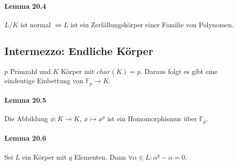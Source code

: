 \documentclass{scrartcl}
\begin{document}
\paragraph{Lemma 20.4}
$L/K$ ist normal $\Leftrightarrow L$ ist ein Zerfällungskörper einer Familie von Polynomen.

\subsection{Intermezzo: Endliche Körper}

$p$ Primzahl und $K$ Körper mit $char(K)=p$. Daraus folgt es gibt eine
eindeutige Einbettung von $\mathbb{F}_p \to K$.
\paragraph{Lemma 20.5}
Die Abbildung $\phi: K \to K,~x \mapsto x^p$ ist ein Homomorphismus über $\mathbb{F}_p$.

\paragraph{Lemma 20.6}
Sei $L$ ein Körper mit $q$ Elementen. Dann $\forall \alpha \in L: \alpha^q -
\alpha = 0$.
\end{document}
